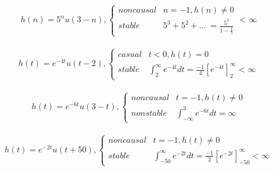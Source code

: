 \documentclass{article}[12pt]
\begin{document}
\begin{equation}
	\begin{gathered}
		h( n) =5^{n} u( 3-n) ,\begin{cases}
			noncausal & n=-1,h( n) \neq 0\\
			stable & 5^{3} +5^{2} +...\ =\frac{5^{3}}{1-\frac{1}{5}}
		\end{cases} < \infty 
	\end{gathered}
\end{equation}


\begin{equation}
	\begin{gathered}
		h( t) =e^{-4t} u( t-2) ,\begin{cases}
			casual & t< 0,h( t) =0\\
			stable & \int _{2}^{\infty } e^{-4t} dt=\frac{-1}{4}\left[ e^{-4t}\right]_{2}^{\infty } < \infty 
		\end{cases}
	\end{gathered}
\end{equation}


\begin{equation}
	\begin{gathered}
		h( t) =e^{-6t} u( 3-t) ,\begin{cases}
			noncausal & t=-1,h( t) \neq 0\\
			nonstable & \int _{-\infty }^{3} e^{-6t} dt=\infty 
		\end{cases}
	\end{gathered}
\end{equation}


\begin{equation}
	\begin{gathered}
		h( t) =e^{-2t} u( t+50) ,\begin{cases}
			noncausal & t=-1,h( t) \neq 0\\
			stable & \int _{-50}^{\infty } e^{-2t} dt=\frac{-1}{2}\left[ e^{-2t}\right]_{-50}^{\infty } < \infty 
		\end{cases}
	\end{gathered}
\end{equation}

 
\end{document}
